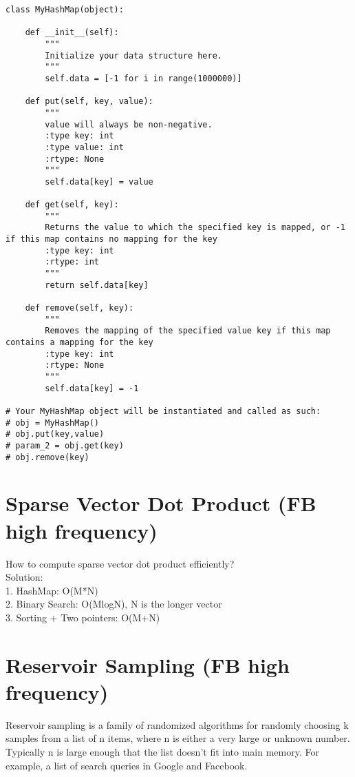 \begin{lstlisting}
class MyHashMap(object):

    def __init__(self):
        """
        Initialize your data structure here.
        """
        self.data = [-1 for i in range(1000000)]
        
    def put(self, key, value):
        """
        value will always be non-negative.
        :type key: int
        :type value: int
        :rtype: None
        """
        self.data[key] = value
        
    def get(self, key):
        """
        Returns the value to which the specified key is mapped, or -1 if this map contains no mapping for the key
        :type key: int
        :rtype: int
        """
        return self.data[key]
        
    def remove(self, key):
        """
        Removes the mapping of the specified value key if this map contains a mapping for the key
        :type key: int
        :rtype: None
        """
        self.data[key] = -1

# Your MyHashMap object will be instantiated and called as such:
# obj = MyHashMap()
# obj.put(key,value)
# param_2 = obj.get(key)
# obj.remove(key)
\end{lstlisting}

\section{Sparse Vector Dot Product (FB high frequency)}
How to compute sparse vector dot product efficiently?\\
Solution:\\
1. HashMap: O(M*N)\\
2. Binary Search: O(MlogN), N is the longer vector\\
3. Sorting + Two pointers: O(M+N)\\

\section{Reservoir Sampling (FB high frequency)}
Reservoir sampling is a family of randomized algorithms for randomly choosing k samples from a list of n items, where n is either a very large or unknown number. Typically n is large enough that the list doesn’t fit into main memory. For example, a list of search queries in Google and Facebook.

